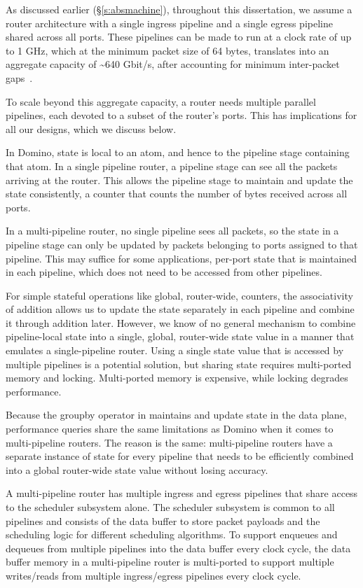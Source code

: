 As discussed earlier (\S\ref{s:absmachine}), throughout this dissertation, we
assume a router architecture with a single ingress pipeline and a single egress
pipeline shared across all ports. These pipelines can be made to run at a clock
rate of up to 1 GHz, which at the minimum packet size of 64 bytes, translates
into an aggregate capacity of \textasciitilde640 Gbit/s, after accounting for
minimum inter-packet gaps~\cite{rmt}.

To scale beyond this aggregate capacity, a router needs multiple parallel
pipelines, each devoted to a subset of the router's ports. This has
implications for all our designs, which we discuss below.

 In Domino, state is local to an atom, and hence to the pipeline
stage containing that atom.  In a single pipeline router, a pipeline stage can
see all the packets arriving at the router. This allows the pipeline stage to
maintain and update the state consistently, \eg a counter that counts the
number of bytes received across all ports.

In a multi-pipeline router, no single pipeline sees all packets, so the state
in a pipeline stage can only be updated by packets belonging to ports assigned
to that pipeline. This may suffice for some applications, \eg per-port state
that is maintained in each pipeline, which does not need to be accessed from
other pipelines. 

For simple stateful operations like global, router-wide, counters, the
associativity of addition allows us to update the state separately in each
pipeline and combine it through addition later. However, we know of no general
mechanism to combine pipeline-local state into a single, global, router-wide state value
in a manner that emulates a single-pipeline router. Using a single state value
that is accessed by multiple pipelines is a potential solution, but sharing
state requires multi-ported memory and locking. Multi-ported memory is
expensive, while locking degrades performance.

 Because the {\ct groupby} operator in \TheSystem
maintains and update state in the data plane, performance queries share the
same limitations as Domino when it comes to multi-pipeline routers. The reason
is the same: multi-pipeline routers have a separate instance of state for every
pipeline that needs to be efficiently combined into a global router-wide state
value without losing accuracy.

 A multi-pipeline router has multiple ingress and egress pipelines
that share access to the scheduler subsystem alone. The scheduler subsystem is
common to all pipelines and consists of the data buffer to store packet
payloads and the scheduling logic for different scheduling algorithms. To
support enqueues and dequeues from multiple pipelines into the data buffer
every clock cycle, the data buffer memory in a multi-pipeline router is
multi-ported to support multiple writes/reads from multiple ingress/egress
pipelines every clock cycle.

